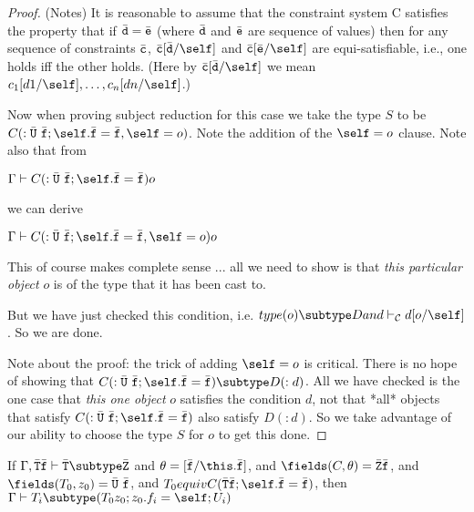 \begin{proof}
(Notes)
It is reasonable to assume that the constraint system {\cal C} satisfies the
property that if $\bar{\tt d} = \bar{\tt e}$ (where $\bar{\tt d}$ and $\bar{\tt e}$ 
are sequence of values) 
then
for any sequence of constraints $\bar{\tt c}$, $\bar{\tt c}[\bar{\tt d}/\self]$ and 
$\bar{\tt c} [\bar{\tt e}/\self]$
are equi-satisfiable, i.e., one holds iff the other holds. 
(Here by $\bar{\tt c} [\bar{\tt d}/\self]$ we mean $c_1[d1/\self], \ldots, c_n[dn/\self]$.)

Now when proving subject reduction for this case we take the type $S$ to be 
$C(: \bar{\tt U}\ \bar{\tt f}; \self.\bar{\tt f} = \bar{\tt f}, \self=o)$.
Note the addition of the $\self=o$ clause. 
Note also that from

$\Gamma \vdash C(: \bar{\tt U}\ \bar{\tt f}; \self.\bar{\tt f} = \bar{\tt f}) o$

we can derive

$\Gamma \vdash C(: \bar{\tt U}\ \bar{\tt f}; \self.\bar{\tt f} = \bar{\tt f}, \self=o) o$

This of course makes complete sense ... all we need to show is that {\em this
particular object} $o$ is of the type that it has been cast to.

But we have just checked this condition, i.e. 
$type(o) \subtype D and \vdash_{\cal C} d[o/\self]$. 
So we are done.

Note about the proof:
the trick of adding $\self=o$ is critical. There is no hope of showing
that $C(: \bar{\tt U}\ \bar{\tt f}; \self.\bar{\tt f} = \bar{\tt f}) \subtype D(:d)$. 
All we have checked is the one case that {\em this one object\/} $o$ 
satisfies the condition $d$, not that *all* objects 
that satisfy $C(: \bar{\tt U}\ \bar{\tt f}; \self.\bar{\tt f} = \bar{\tt f})$ 
also satisfy $D(:d)$. 
So we take advantage of our ability to choose the type $S$ for $o$ 
to get this done.

\end{proof}

\begin{lemma}
\label{lemmaseven} %
If   $\Gamma, \bar{\tt T} \bar{\tt f} \vdash \bar{\tt T} \subtype \bar{\tt Z}$
and  $\theta = [\bar{\tt f} / \this.\bar{\tt f}]$,
and  $\fields(C,\theta) = \bar{\tt Z} \bar{\tt f}$,
and  $\fields(T_0,z_0) = \bar{\tt U}\ \bar{\tt f}$,
and  $T_0 equiv C(\bar{\tt T} \bar{\tt f}; \self.\bar{\tt f} = \bar{\tt f})$,
then $\Gamma \vdash T_i \subtype (T_0 z_0; z_0.f_i = \self; U_i)$
\end{lemma}


